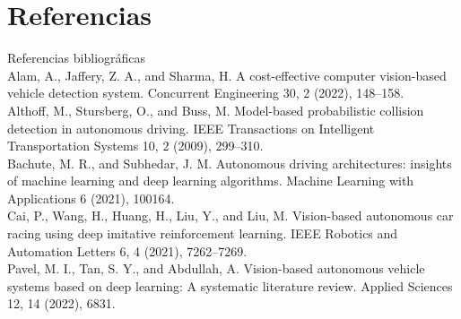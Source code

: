 \documentclass[8pt]{beamer}
\begin{document}
    \section{Referencias}
    \begin{frame}{Referencias bibliográficas}
        \\[1] Alam, A., Jaffery, Z. A., and Sharma, H. A cost-effective computer vision-based vehicle
        detection system. Concurrent Engineering 30, 2 (2022), 148–158.
        \\[2] Althoff, M., Stursberg, O., and Buss, M. Model-based probabilistic collision detection in
        autonomous driving. IEEE Transactions on Intelligent Transportation Systems 10, 2 (2009),
        299–310.
        \\[3] Bachute, M. R., and Subhedar, J. M. Autonomous driving architectures: insights of
        machine learning and deep learning algorithms. Machine Learning with Applications 6
        (2021), 100164.
        \\[4] Cai, P., Wang, H., Huang, H., Liu, Y., and Liu, M. Vision-based autonomous car racing
        using deep imitative reinforcement learning. IEEE Robotics and Automation Letters 6, 4
        (2021), 7262–7269.
        \\[5] Pavel, M. I., Tan, S. Y., and Abdullah, A. Vision-based autonomous vehicle systems
        based on deep learning: A systematic literature review. Applied Sciences 12, 14 (2022),
        6831.

    \end{frame}
    
    \begin{frame}
        \titlepage
    \end{frame}
    
\end{document}
